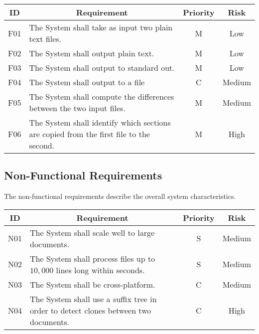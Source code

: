 \begin{center}
\begin{longtable}{c p{2.8in} c c }

	\toprule
	\textbf{ID} & \multicolumn{1}{c}{\textbf{Requirement}} & \textbf{Priority} & \textbf{Risk} \\
	\midrule
	
	F01 & The System shall take as input two plain text files. & M & Low \\
	F02 & The System shall output plain text. & M & Low \\
	F03 & The System shall output to standard out. & M & Low \\
	F04 & The System shall output to a file        & C & Medium \\
	F05 & The System shall compute the differences between the two input files. & M & Medium \\
	F06 & The System shall identify which sections are copied from the first file to the second. & M & High \\

\bottomrule        
\end{longtable}
\end{center}

\subsection{Non-Functional Requirements}

The non-functional requirements describe the overall system characteristics.

\begin{center}
\begin{longtable}{c p{2.8in} c c }

	\toprule
	\textbf{ID} & \multicolumn{1}{c}{\textbf{Requirement}} & \textbf{Priority} & \textbf{Risk} \\
	\midrule
	
	N01 & The System shall scale well to large documents. & S & Medium \\
	N02 & The System shall process files up to $10,000$ lines long within seconds. & S & Medium \\
	N03 & The System shall be cross-platform. & C & Medium \\
	N04 & The System shall use a suffix tree in order to detect clones between two documents. & C & High \\
	
\bottomrule
\end{longtable}
\end{center}
